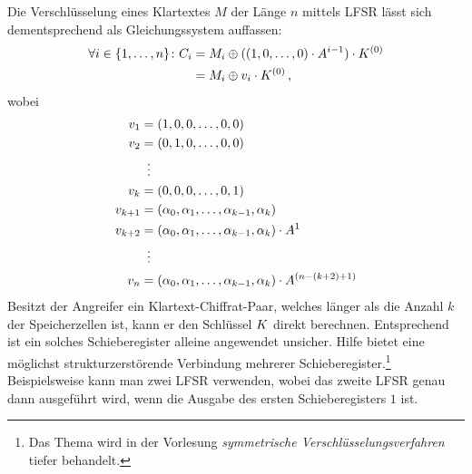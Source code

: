 Die Verschlüsselung eines Klartextes $M$ der Länge $n$ mittels LFSR lässt sich dementsprechend als Gleichungssystem auffassen:
\begin{align*}
	\begin{split}
			\forall i \in \{1,\dots,n\} \colon C_i 	&= M_i \oplus ((1,0,\dots,0) \cdot A^{i-1}) \cdot K^{(0)}\\
									&= M_i \oplus v_i \cdot K^{(0)} \, \text{,}
	\end{split}
\end{align*}
wobei
\begin{align*}
	v_1 &= (1,0,0,\dots,0,0)\\
	v_2 &= (0,1,0,\dots,0,0)\\
	       &\mathrel{\makebox[\widthof{=}]{\vdots}}\\
	v_k &= (0,0,0,\dots,0,1)\\
	v_{k+1} &= (\alpha_0,\alpha_1,\dots,\alpha_{k-1},\alpha_k)\\
	v_{k+2} &= (\alpha_0,\alpha_1,\dots,\alpha_{k-1},\alpha_k) \cdot A^1\\
	             &\mathrel{\makebox[\widthof{=}]{\vdots}}\\
	v_n &= (\alpha_0,\alpha_1,\dots,\alpha_{k-1},\alpha_k) \cdot A^{(n-(k+2)+1)}
\end{align*}
Besitzt der Angreifer ein Klartext-Chiffrat-Paar, welches länger als die Anzahl $k$ der Speicherzellen ist, kann er den Schlüssel $K$ direkt berechnen. Entsprechend ist ein solches Schieberegister alleine angewendet unsicher. Hilfe bietet eine möglichst strukturzerstörende Verbindung mehrerer Schieberegister.\footnote{Das Thema wird in der Vorlesung \emph{symmetrische Verschlüsselungsverfahren} tiefer behandelt.} Beispielsweise kann man zwei LFSR verwenden, wobei das zweite LFSR genau dann ausgeführt wird, wenn die Ausgabe des ersten Schieberegisters $1$ ist.

